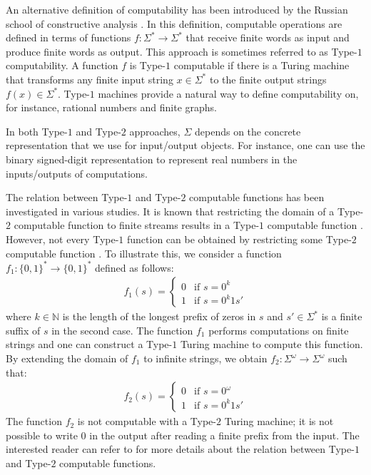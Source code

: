 \documentclass{article}
\newcommand{\nat}{\mathbb{N}}
\numberwithin{mytheorem}{section}
\begin{document}
An alternative definition of computability has been introduced by the Russian school of constructive analysis \cite{M54,K84}. In this definition, computable operations are defined in terms of functions $f:\Sigma^*\rightarrow \Sigma^*$ that receive finite words as input and produce finite words as output. This approach is sometimes referred to as Type-$1$ computability. A function $f$ is Type-$1$ computable if there is a Turing machine that transforms any finite input string $x\in \Sigma^*$ to the finite output strings $f(x)\in \Sigma^*$. Type-$1$ machines provide a natural way to define computability on, for instance, rational numbers and finite graphs. 


In both Type-$1$ and Type-$2$ approaches, $\Sigma$ depends on the concrete representation that we use for input/output objects. For instance, one can use the binary signed-digit representation to represent real numbers in the inputs/outputs of computations. 

The relation between Type-$1$ and Type-$2$ computable functions has been investigated in various studies. It is known that restricting the domain of a Type-$2$ computable function to finite streams results in a Type-$1$ computable function \cite{H96,RW99}. However, not every Type-$1$ function can be obtained by restricting some Type-$2$ computable function \cite{RW99,KLS00}. To illustrate this, we consider a function $f_1: \{0,1\}^*\rightarrow \{0,1\}^*$ defined as follows:
\begin{align*}
f_1(s)=
\begin{cases}
0& \text{if } s=0^k\\
1& \text{if } s=0^k1s'
\end{cases}
\end{align*}
where $k\in \nat$ is the length of the longest prefix of zeros in $s$ and $s'\in \Sigma^*$ is a finite suffix of $s$ in the second case. The function $f_1$ performs computations on finite strings and one can construct a Type-$1$ Turing machine to compute this function. By extending the domain of $f_1$ to infinite strings, we obtain $f_2: \Sigma^{\omega} \rightarrow \Sigma^{\omega}$ such that:
\begin{align*}
f_2(s)=
\begin{cases}
0& \text{if } s=0^\omega\\
1& \text{if } s=0^k1s'
\end{cases}
\end{align*}
The function $f_2$ is not computable with a Type-$2$ Turing machine; it is not possible to write $0$ in the output after reading a finite prefix from the input. The interested reader can refer to \cite{H96} for more details about the relation between Type-$1$ and Type-$2$ computable functions. 
\end{document}
